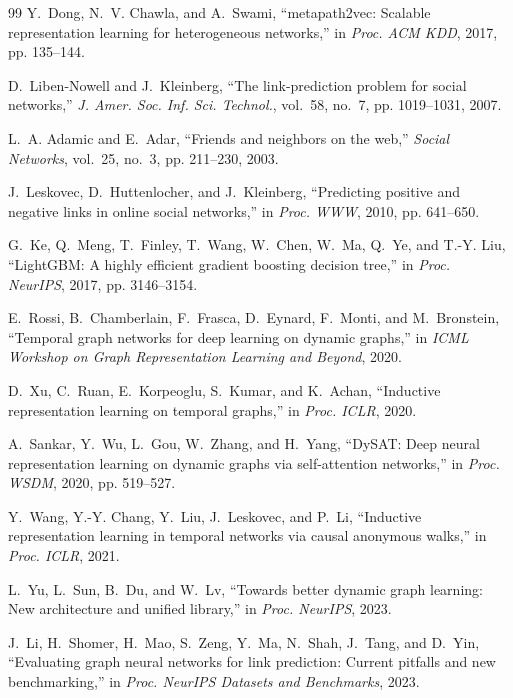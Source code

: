 \documentclass[conference]{IEEEtran}
\begin{document}
\begin{thebibliography}{99}
Y.~Dong, N.~V. Chawla, and A.~Swami, ``metapath2vec: Scalable representation learning for heterogeneous networks,'' in \emph{Proc. ACM KDD}, 2017, pp. 135--144.

D.~Liben-Nowell and J.~Kleinberg, ``The link-prediction problem for social networks,'' \emph{J. Amer. Soc. Inf. Sci. Technol.}, vol.~58, no.~7, pp. 1019--1031, 2007.

L.~A. Adamic and E.~Adar, ``Friends and neighbors on the web,'' \emph{Social Networks}, vol.~25, no.~3, pp. 211--230, 2003.

J.~Leskovec, D.~Huttenlocher, and J.~Kleinberg, ``Predicting positive and negative links in online social networks,'' in \emph{Proc. WWW}, 2010, pp. 641--650.

G.~Ke, Q.~Meng, T.~Finley, T.~Wang, W.~Chen, W.~Ma, Q.~Ye, and T.-Y. Liu, ``LightGBM: A highly efficient gradient boosting decision tree,'' in \emph{Proc. NeurIPS}, 2017, pp. 3146--3154.

E.~Rossi, B.~Chamberlain, F.~Frasca, D.~Eynard, F.~Monti, and M.~Bronstein, ``Temporal graph networks for deep learning on dynamic graphs,'' in \emph{ICML Workshop on Graph Representation Learning and Beyond}, 2020.

D.~Xu, C.~Ruan, E.~Korpeoglu, S.~Kumar, and K.~Achan, ``Inductive representation learning on temporal graphs,'' in \emph{Proc. ICLR}, 2020.

A.~Sankar, Y.~Wu, L.~Gou, W.~Zhang, and H.~Yang, ``DySAT: Deep neural representation learning on dynamic graphs via self-attention networks,'' in \emph{Proc. WSDM}, 2020, pp. 519--527.

Y.~Wang, Y.-Y. Chang, Y.~Liu, J.~Leskovec, and P.~Li, ``Inductive representation learning in temporal networks via causal anonymous walks,'' in \emph{Proc. ICLR}, 2021.

L.~Yu, L.~Sun, B.~Du, and W.~Lv, ``Towards better dynamic graph learning: New architecture and unified library,'' in \emph{Proc. NeurIPS}, 2023.

J.~Li, H.~Shomer, H.~Mao, S.~Zeng, Y.~Ma, N.~Shah, J.~Tang, and D.~Yin, ``Evaluating graph neural networks for link prediction: Current pitfalls and new benchmarking,'' in \emph{Proc. NeurIPS Datasets and Benchmarks}, 2023.


\end{thebibliography}
\end{document}
